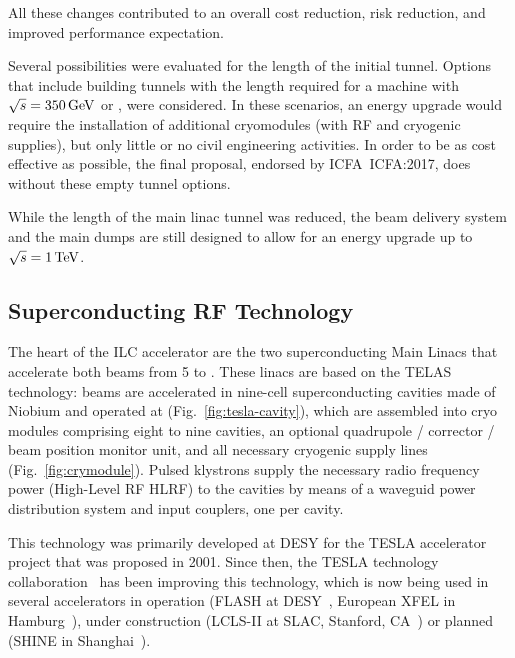 All these changes contributed to an overall cost reduction, risk reduction, and improved performance expectation.

Several possibilities were evaluated for the length of the initial tunnel. 
Options that include building tunnels with the length required for a machine with $\sqrt{s} = 350\,{\mathrm{GeV}}$ or , were considered.
In these scenarios, an energy upgrade would require the installation of additional cryomodules (with RF and cryogenic supplies), but only little or no civil engineering activities.
In order to be as cost effective as possible, the final proposal, endorsed by ICFA~{ICFA:2017}, does without these empty tunnel options. 

While the length of the main linac tunnel was reduced, the beam delivery system and the main dumps are still designed to allow for an energy upgrade up to  $\sqrt{s} = 1\,{\mathrm{TeV}}$.


\subsection{Superconducting RF Technology}


%
%
%
%


The heart of the ILC accelerator are the two superconducting Main Linacs that accelerate both beams from \num{5} to .
These linacs are based on the TELAS technology:
beams are accelerated in  nine-cell superconducting cavities made of Niobium and operated at  (Fig.~\ref{fig:tesla-cavity}), 
which are assembled into cryo modules comprising eight to nine cavities, an optional quadrupole / corrector / beam position monitor unit, and all necessary cryogenic supply lines (Fig.~\ref{fig:crymodule}). 
Pulsed klystrons supply the necessary radio frequency power (High-Level RF HLRF) to the cavities by means of a waveguid power distribution system and input couplers, one per cavity.

This technology was primarily developed at DESY for the TESLA accelerator project that was proposed in 2001.
Since then, the TESLA technology collaboration~\cite{bib:ttc} has been improving this technology, which is now being used in several accelerators in operation (FLASH at DESY~\cite{schreiber_faatz_2015,Vogt:2018wvy}, European XFEL in Hamburg~\cite{bib:xfel}), under construction (LCLS-II at SLAC, Stanford, CA~\cite{bib:lcls-ii}) or planned (SHINE in Shanghai~\cite{Zhao:2018lcl}).


